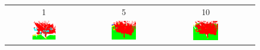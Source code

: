     \begin{figure}[h!]
        \begin{tabular}{cccc}
            1 & 5 & 10 \\
            \includegraphics[width=0.33\textwidth, height=0.18\textheight]{images/seg_output/deep_ensembles/1_1.png} &
            \includegraphics[width=0.33\textwidth, height=0.18\textheight]{images/seg_output/deep_ensembles/1_5.png}& 
            \includegraphics[width=0.33\textwidth, height=0.18\textheight]{images/seg_output/deep_ensembles/1_10.png}\\


\end{tabular}
\end{figure}
